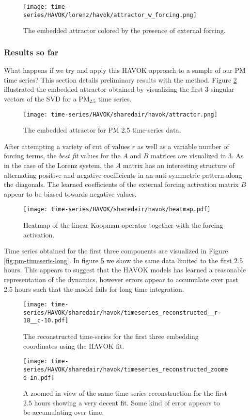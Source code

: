 \begin{figure}[!hbt]
  \centering
  \texttt{[image: time-series/HAVOK/lorenz/havok/attractor\_w\_forcing.png]}
  \caption{The embedded attractor colored by the presence of external forcing.}
  \label{fig:lorenz-attractor-forcing}
\end{figure}


\subsubsection{Results so far}

What happens if we try and apply this HAVOK approach to a sample of our PM time series? This section details preliminary results with the method. Figure \ref{fig:attractor-pm} illustrated the embedded attractor obtained by visualizing the first 3 singular vectors of the SVD for a $\text{PM}_{2.5}$ time series.
\begin{figure}[!hbt]
  \centering
  \texttt{[image: time-series/HAVOK/sharedair/havok/attractor.png]}
  \caption{The embedded attractor for PM $2.5$ time-series data.}
  \label{fig:attractor-pm}
\end{figure}
After attempting a variety of cut of values $r$ as well as a variable number of forcing terms, the \textit{best fit} values for the $A$ and $B$ matrices are visualized in \ref{fig:pm-a-b-mats}. As in the case of the Lorenz system, the $A$ matrix has an interesting structure of alternating positive and negative coefficients in an anti-symmetric pattern along the diagonals. The learned coefficients of the external forcing activation matrix $B$ appear to be biased towards negative values.
\begin{figure}[h]
  \centering
  \texttt{[image: time-series/HAVOK/sharedair/havok/heatmap.pdf]}
  \caption{Heatmap of the linear Koopman operator together with the forcing activation.}
  \label{fig:pm-a-b-mats}
\end{figure}
Time series obtained for the first three components are visualized in Figure \ref{fig:pm-timeseris-long}. In figure \ref{fig:pm-timeseries-zoomed} we show the same data limited to the first 2.5 hours. This appears to suggest that the HAVOK models has learned a reasonable representation of the dynamics, however errors appear to accumulate over past 2.5 hours such that the model fails for long time integration.
\begin{figure}[h]
  \centering
  \texttt{[image: time-series/HAVOK/sharedair/havok/timeseries\_reconstructed\_\_r-18\_\_c-10.pdf]}
  \caption{The reconstructed time-series for the first three embedding coordinates using the HAVOK fit.}
  \label{fig:pm-timeseries-long}
\end{figure}
\begin{figure}[h]
  \centering
  \texttt{[image: time-series/HAVOK/sharedair/havok/timeseries\_reconstructed\_zoomed-in.pdf]}
  \caption{A zoomed in view of the same time-series reconstruction for the first $2.5$ hours showing a very decent fit. Some kind of error appears to be accumulating over time.}
  \label{fig:pm-timeseries-zoomed}
\end{figure}

